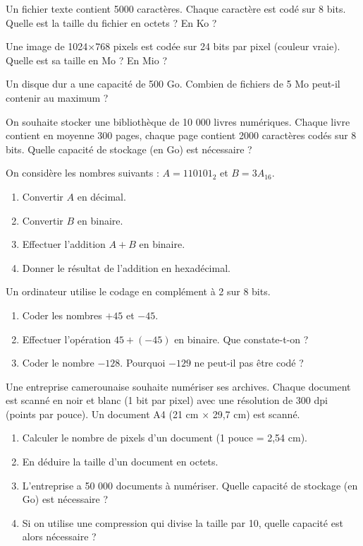 \exo{}
Un fichier texte contient 5000 caractères. Chaque caractère est codé sur 8 bits. Quelle est la taille du fichier en octets ? En Ko ?

\exo{}
Une image de 1024×768 pixels est codée sur 24 bits par pixel (couleur vraie). Quelle est sa taille en Mo ? En Mio ?

\exo{}
Un disque dur a une capacité de 500 Go. Combien de fichiers de 5 Mo peut-il contenir au maximum ?

\exo{}
On souhaite stocker une bibliothèque de 10 000 livres numériques. Chaque livre contient en moyenne 300 pages, chaque page contient 2000 caractères codés sur 8 bits. Quelle capacité de stockage (en Go) est nécessaire ?


\sujetbac[2020, Cameroun, C]
\exo{}
On considère les nombres suivants : $A = 110101_2$ et $B = 3A_{16}$.
\begin{enumerate}
    \item Convertir $A$ en décimal.
    \item Convertir $B$ en binaire.
    \item Effectuer l'addition $A + B$ en binaire.
    \item Donner le résultat de l'addition en hexadécimal.
\end{enumerate}

\sujetbac[2021, Cameroun, D]
\exo{}
Un ordinateur utilise le codage en complément à 2 sur 8 bits.
\begin{enumerate}
    \item Coder les nombres $+45$ et $-45$.
    \item Effectuer l'opération $45 + (-45)$ en binaire. Que constate-t-on ?
    \item Coder le nombre $-128$. Pourquoi $-129$ ne peut-il pas être codé ?
\end{enumerate}

\sujetbac[2022, Cameroun, E]
\exo{}
Une entreprise camerounaise souhaite numériser ses archives. Chaque document est scanné en noir et blanc (1 bit par pixel) avec une résolution de 300 dpi (points par pouce). Un document A4 (21 cm × 29,7 cm) est scanné.
\begin{enumerate}
    \item Calculer le nombre de pixels d'un document (1 pouce = 2,54 cm).
    \item En déduire la taille d'un document en octets.
    \item L'entreprise a 50 000 documents à numériser. Quelle capacité de stockage (en Go) est nécessaire ?
    \item Si on utilise une compression qui divise la taille par 10, quelle capacité est alors nécessaire ?
\end{enumerate}

